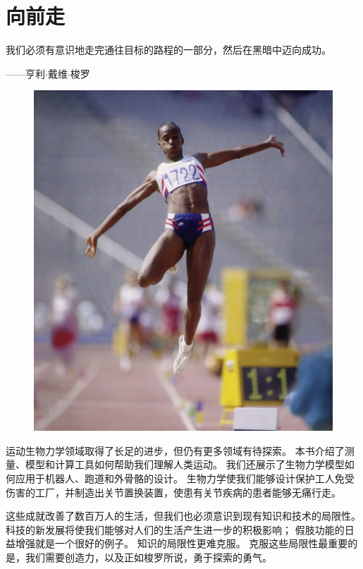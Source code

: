 \chapter{向前走} \label{chap:chap12}


我们必须有意识地走完通往目标的路程的一部分，然后在黑暗中迈向成功。
\begin{flushright}
	——亨利$\cdot$戴维$\cdot$梭罗
\end{flushright}


\begin{figure}[!htb]
	\centering
	\includegraphics[width=1.0\linewidth]{chap13/13_0}
	\caption*{ \label{fig:13_0}}
\end{figure}

运动生物力学领域取得了长足的进步，但仍有更多领域有待探索。
本书介绍了测量、模型和计算工具如何帮助我们理解人类运动。
我们还展示了生物力学模型如何应用于机器人、跑道和外骨骼的设计。
生物力学使我们能够设计保护工人免受伤害的工厂，并制造出关节置换装置，使患有关节疾病的患者能够无痛行走。


这些成就改善了数百万人的生活，但我们也必须意识到现有知识和技术的局限性。
科技的新发展将使我们能够对人们的生活产生进一步的积极影响；
假肢功能的日益增强就是一个很好的例子。
知识的局限性更难克服。
克服这些局限性最重要的是，我们需要创造力，以及正如梭罗所说，勇于探索的勇气。


